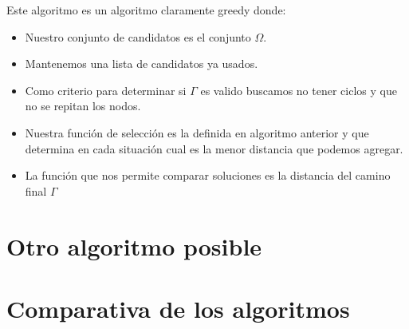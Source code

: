 \documentclass{article}
\begin{document}
Este algoritmo es un algoritmo claramente greedy donde:

\begin{itemize}
\item Nuestro conjunto de candidatos es el conjunto $\Omega$.
\item Mantenemos una lista de candidatos ya usados.
\item Como criterio para determinar si $\Gamma$ es valido buscamos no
  tener ciclos y que no se repitan los nodos.
\item Nuestra función de selección es la definida en algoritmo
  anterior y que determina en cada situación cual es la menor
  distancia que podemos agregar.
\item La función que nos permite comparar soluciones es la distancia
  del camino final $\Gamma$
\end{itemize}

\section{Otro algoritmo posible}
\section{Comparativa de los algoritmos}
\end{document}
